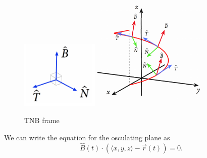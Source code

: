 \begin{figure}[H]
	\label{osculating_plane_circle}
	\centering
	\includegraphics[width = 0.33\textwidth]{./Images/vectorValuedFunctions/TNB1.png}
	\includegraphics[width = 0.5\textwidth]{./Images/vectorValuedFunctions/TNB2.png}
	\caption{TNB frame}
\end{figure}

\noindent
We can write the equation for the osculating plane as
\begin{equation*}
	\hat{B}(t)\cdot\left(\langle x,y,z\rangle - \vec{r}(t)\right) = 0.
\end{equation*}